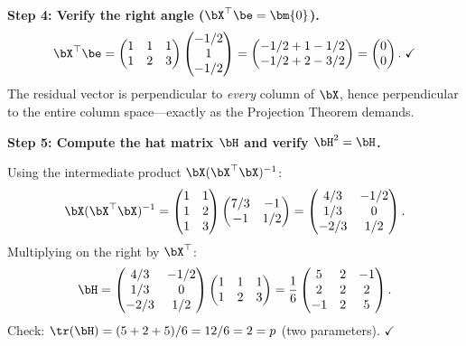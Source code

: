 \begin{example}
\medskip\noindent\textbf{Step 4: Verify the right angle ($\bX^\top\be = \bm{0}$).}
\[
\bX^\top\be
= \begin{pmatrix} 1 & 1 & 1 \\ 1 & 2 & 3 \end{pmatrix}
  \begin{pmatrix} -1/2 \\ 1 \\ -1/2 \end{pmatrix}
= \begin{pmatrix} -1/2 + 1 - 1/2 \\ -1/2 + 2 - 3/2 \end{pmatrix}
= \begin{pmatrix} 0 \\ 0 \end{pmatrix}. \;\checkmark
\]
The residual vector is perpendicular to \emph{every} column of $\bX$,
hence perpendicular to the entire column space---exactly as the
Projection Theorem demands.

\medskip\noindent\textbf{Step 5: Compute the hat matrix $\bH$ and verify $\bH^2 = \bH$.}

Using the intermediate product $\bX(\bX^\top\bX)^{-1}$:
\[
\bX(\bX^\top\bX)^{-1}
= \begin{pmatrix} 1 & 1 \\ 1 & 2 \\ 1 & 3 \end{pmatrix}
  \begin{pmatrix} 7/3 & -1 \\ -1 & 1/2 \end{pmatrix}
= \begin{pmatrix} 4/3 & -1/2 \\ 1/3 & 0 \\ -2/3 & 1/2 \end{pmatrix}.
\]
Multiplying on the right by $\bX^\top$:
\[
\bH = \begin{pmatrix} 4/3 & -1/2 \\ 1/3 & 0 \\ -2/3 & 1/2 \end{pmatrix}
\begin{pmatrix} 1 & 1 & 1 \\ 1 & 2 & 3 \end{pmatrix}
= \frac{1}{6}\begin{pmatrix} 5 & 2 & -1 \\ 2 & 2 & 2 \\ -1 & 2 & 5 \end{pmatrix}.
\]
Check: $\tr(\bH) = (5+2+5)/6 = 12/6 = 2 = p$ (two parameters). $\checkmark$


\end{example}
